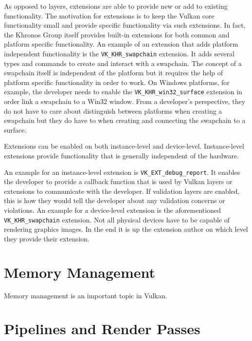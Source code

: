     As opposed to layers, extensions are able to provide new or add to existing functionality. The motivation for extensions is to keep the Vulkan core functionality small and provide specific functionality via such extensions. In fact, the Khronos Group itself provides built-in extensions for both common and platform specific functionality. An example of an extension that adds platform independent functionality is the \lstinline{VK_KHR_swapchain} extension. It adds several types and commands to create and interact with a swapchain. The concept of a swapchain itself is independent of the platform but it requires the help of platform specific functionality in order to work. On Windows platforms, for example, the developer needs to enable the \lstinline{VK_KHR_win32_surface} extension in order link a swapchain to a Win32 window. From a developer's perspective, they do not have to care about distinguish between platforms when creating a swapchain but they do have to when creating and connecting the swapchain to a surface.

    Extensions can be enabled on both instance-level and device-level. Instance-level extensions provide functionality that is generally independent of the hardware.

    An example for an instance-level extension is \lstinline{VK_EXT_debug_report}. It enables the developer to provide a callback function that is used by Vulkan layers or extensions to communicate with the developer. If validation layers are enabled, this is how they would tell the developer about any validation concerns or violations. An example for a device-level extension is the aforementioned \lstinline{VK_KHR_swapchain} extension. Not all physical devices have to be capable of rendering graphics images. In the end it is up the extension author on which level they provide their extension.

  \section{Memory Management}
  \label{sec:MemoryManagement}

    Memory management is an important topic in Vulkan.

    \lipsum

  \section{Pipelines and Render Passes}
  \label{sec:RenderPasses}
    \lipsum

